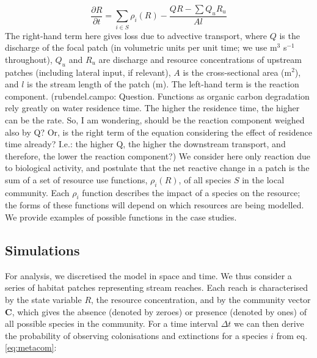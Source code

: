 \begin{equation}
	\frac{\partial R}{\partial t} = \sum_{i \in S}{\rho_i(R)} -\frac{QR - \sum Q_u R_u}{A l} 
	\label{eq:rxn_transport}
\end{equation}
The right-hand term here gives loss due to advective transport, where $Q$ is the discharge of the focal patch (in volumetric units per unit time; we use m$^3$ s$^{-1}$ throughout), $Q_u$ and $R_u$ are discharge and resource concentrations of upstream patches (including lateral input, if relevant), $A$ is the cross-sectional area (m$^2$), and $l$ is the stream length of the patch (m).
The left-hand term is the reaction component. (rubendel.campo: Question. Functions as organic carbon degradation rely greatly on water residence time. The higher the residence time, the higher can be the rate. So, I am wondering, should be the reaction component weighed also by Q? Or, is the right term of the equation considering the effect of residence time already? I.e.: the higher Q, the higher the downstream transport, and therefore, the lower the reaction component?)
We consider here only reaction due to biological activity, and postulate that the net reactive change in a patch is the sum of a set of resource use functions, $\rho_i(R)$, of all species $S$ in the local community. 
Each $\rho_i$ function describes the impact of a species on the resource; the forms of these functions will depend on which resources are being modelled.
We provide examples of possible functions in the case studies.


\subsection{Simulations}

For analysis, we discretised the model in space and time.
We thus consider a series of habitat patches representing stream reaches.
Each reach is characterised by the state variable $R$, the resource concentration, and by the community vector $\mathbf{C}$, which gives the absence (denoted by zeroes) or presence (denoted by ones) of all possible species in the community.
For a time interval $\Delta t$ we can then derive the probability of observing colonisations and extinctions for a species $i$ from eq. \ref{eq:metacom}:

